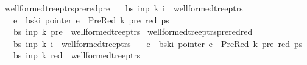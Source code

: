 \begin{isabellebody}
\isadelimproof
%
\endisadelimproof
%
\isatagproof
%
\endisatagproof
{\isafoldproof}%
%
\isadelimproof
\isanewline
%
\endisadelimproof
{}\isamarkupfalse%
\ wellformed{\isacharunderscore}{\kern0pt}tree{\isacharunderscore}{\kern0pt}ptrs{\isacharunderscore}{\kern0pt}prered{\isacharunderscore}{\kern0pt}pre{\isacharcolon}{\kern0pt}\isanewline
\ \ \ {\isachardoublequoteopen}{\isacharparenleft}{\kern0pt}bs{\isacharcomma}{\kern0pt}\ inp{\isacharcomma}{\kern0pt}\ k{\isacharcomma}{\kern0pt}\ i{\isacharparenright}{\kern0pt}\ {\isasymin}\ wellformed{\isacharunderscore}{\kern0pt}tree{\isacharunderscore}{\kern0pt}ptrs{\isachardoublequoteclose}\isanewline
\ \ \ {\isachardoublequoteopen}e\ {\isacharequal}{\kern0pt}\ bs{\isacharbang}{\kern0pt}k{\isacharbang}{\kern0pt}i{\isachardoublequoteclose}\ {\isachardoublequoteopen}pointer\ e\ {\isacharequal}{\kern0pt}\ PreRed\ {\isacharparenleft}{\kern0pt}k{\isacharprime}{\kern0pt}{\isacharcomma}{\kern0pt}\ pre{\isacharcomma}{\kern0pt}\ red{\isacharparenright}{\kern0pt}\ ps{\isachardoublequoteclose}\isanewline
\ \ \ {\isachardoublequoteopen}{\isacharparenleft}{\kern0pt}bs{\isacharcomma}{\kern0pt}\ inp{\isacharcomma}{\kern0pt}\ k{\isacharprime}{\kern0pt}{\isacharcomma}{\kern0pt}\ pre{\isacharparenright}{\kern0pt}\ {\isasymin}\ wellformed{\isacharunderscore}{\kern0pt}tree{\isacharunderscore}{\kern0pt}ptrs{\isachardoublequoteclose}%
\isadelimproof
%
\endisadelimproof
%
\isatagproof
%
\endisatagproof
{\isafoldproof}%
%
\isadelimproof
\isanewline
%
\endisadelimproof
{}\isamarkupfalse%
\ wellformed{\isacharunderscore}{\kern0pt}tree{\isacharunderscore}{\kern0pt}ptrs{\isacharunderscore}{\kern0pt}prered{\isacharunderscore}{\kern0pt}red{\isacharcolon}{\kern0pt}\isanewline
\ \ \ {\isachardoublequoteopen}{\isacharparenleft}{\kern0pt}bs{\isacharcomma}{\kern0pt}\ inp{\isacharcomma}{\kern0pt}\ k{\isacharcomma}{\kern0pt}\ i{\isacharparenright}{\kern0pt}\ {\isasymin}\ wellformed{\isacharunderscore}{\kern0pt}tree{\isacharunderscore}{\kern0pt}ptrs{\isachardoublequoteclose}\isanewline
\ \ \ {\isachardoublequoteopen}e\ {\isacharequal}{\kern0pt}\ bs{\isacharbang}{\kern0pt}k{\isacharbang}{\kern0pt}i{\isachardoublequoteclose}\ {\isachardoublequoteopen}pointer\ e\ {\isacharequal}{\kern0pt}\ PreRed\ {\isacharparenleft}{\kern0pt}k{\isacharprime}{\kern0pt}{\isacharcomma}{\kern0pt}\ pre{\isacharcomma}{\kern0pt}\ red{\isacharparenright}{\kern0pt}\ ps{\isachardoublequoteclose}\isanewline
\ \ \ {\isachardoublequoteopen}{\isacharparenleft}{\kern0pt}bs{\isacharcomma}{\kern0pt}\ inp{\isacharcomma}{\kern0pt}\ k{\isacharcomma}{\kern0pt}\ red{\isacharparenright}{\kern0pt}\ {\isasymin}\ wellformed{\isacharunderscore}{\kern0pt}tree{\isacharunderscore}{\kern0pt}ptrs{\isachardoublequoteclose}%

\end{isabellebody}
